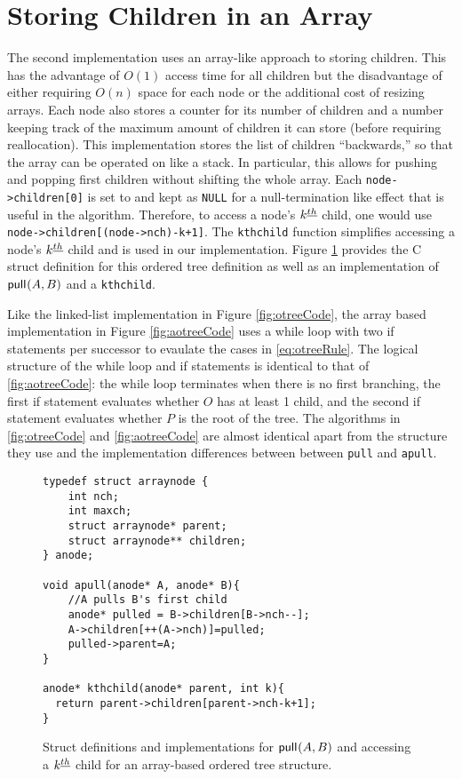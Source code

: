 \section{Storing Children in an Array}\label{sec:otree-arr}
The second implementation uses an array-like approach to storing children.  This has the advantage of $O(1)$ access time for all children but the disadvantage of either requiring $O(n)$ space for each node or the additional cost of resizing arrays.  Each node also stores a counter for its number of children and a number keeping track of the maximum amount of children it can store (before requiring reallocation).  This implementation stores the list of children ``backwards,'' so that the array can be operated on like a stack.  In particular, this allows for pushing and popping first children without shifting the whole array. Each \verb+node->children[0]+ is set to and kept as \verb+NULL+ for a null-termination like effect that is useful in the algorithm. Therefore, to access a node's $k^{\underline{th}}$ child, one would use \verb_node->children[(node->nch)-k+1]_.  The \verb+kthchild+ function simplifies accessing a node's $k^{\underline{th}}$ child and is used in our implementation.  Figure \ref{fig:otreestarter-arr} provides the C struct definition for this ordered tree definition as well as an implementation of $\mathsf{pull}_{}(A,B)$ and a \verb+kthchild+. 

    Like the linked-list implementation in Figure \ref{fig:otreeCode}, the array based implementation in Figure \ref{fig:aotreeCode} uses a while loop with two if statements per successor to evaulate the cases in \eqref{eq:otreeRule}.  The logical structure of the while loop and if statements is identical to that of \ref{fig:aotreeCode}: the while loop terminates when there is no first branching, the first if statement evaluates whether $O$ has at least 1 child, and the second if statement evaluates whether $P$ is the root of the tree.  The algorithms in \ref{fig:otreeCode} and \ref{fig:aotreeCode} are almost identical apart from the structure they use and the implementation differences between between \verb+pull+ and \verb+apull+.

    \begin{figure}
	\begin{center}

	    \begin{Verbatim}
typedef struct arraynode {
    int nch; 
    int maxch;
    struct arraynode* parent;
    struct arraynode** children;
} anode;

void apull(anode* A, anode* B){ 
    //A pulls B's first child
    anode* pulled = B->children[B->nch--];
    A->children[++(A->nch)]=pulled;
    pulled->parent=A;
}

anode* kthchild(anode* parent, int k){
  return parent->children[parent->nch-k+1];
}
	    \end{Verbatim}
	\end{center}

    \cprotect\caption{Struct definitions and implementations for $\mathsf{pull}_{}(A,B)$ and accessing a $k^{\underline{th}}$ child for an array-based ordered tree structure.}
    \label{fig:otreestarter-arr}
\end{figure}

